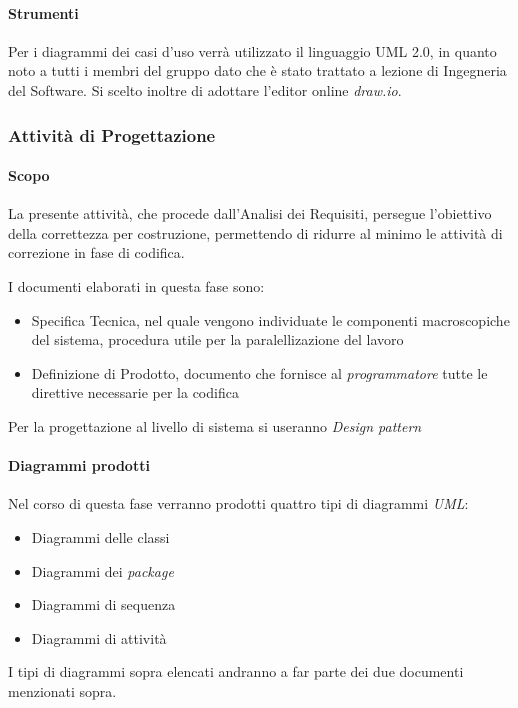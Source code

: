 			
			\paragraph*{Strumenti}
				Per i diagrammi dei casi d'uso verrà utilizzato il linguaggio UML 2.0,
				in quanto noto a tutti i membri del gruppo dato che è stato trattato a lezione
				di Ingegneria del Software.
				Si scelto inoltre di adottare l'editor online \emph{draw.io}.
			
			
		\subsubsection{Attività di Progettazione}
			\paragraph*{Scopo}
		     La presente attivit\`a, che procede dall'Analisi dei Requisiti, persegue l'obiettivo
		     della correttezza per costruzione, permettendo di ridurre al minimo le attività di correzione
		     in fase di codifica.
		     
                     I documenti elaborati in questa fase sono:
                     \begin{itemize}
                       \item Specifica Tecnica, nel quale vengono individuate le componenti macroscopiche del sistema,
                         procedura utile per la paralellizazione del lavoro
                       \item Definizione di Prodotto, documento che fornisce al \textit{programmatore} tutte le direttive necessarie per la codifica
                     \end{itemize}
		 
		 Per la progettazione al livello di sistema si useranno \textit{Design pattern}
                 
                      \paragraph*{Diagrammi prodotti}
                      Nel corso di questa fase verranno prodotti quattro tipi di diagrammi \textit{UML}:
                      \begin{itemize}
                        \item Diagrammi delle classi
                        \item Diagrammi dei \textit{package}
                        \item Diagrammi di sequenza
                        \item Diagrammi di attivit\`a
                      \end{itemize}
                      I tipi di diagrammi sopra elencati andranno a far parte dei due documenti menzionati sopra.
		
